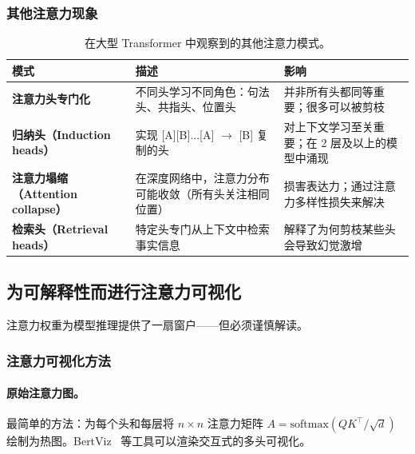 \subsubsection{其他注意力现象}
\label{other-attention-phenomena}

\begin{table}[ht!]
\centering\small
\caption{在大型 Transformer 中观察到的其他注意力模式。}
\noindent\begin{tabularx}{\linewidth}{@{}l Z{1.06} Z{0.94}@{}}
\toprule
\textbf{模式} & \textbf{描述} & \textbf{影响} \\
\midrule
\textbf{注意力头专门化} & 不同头学习不同角色：句法头、共指头、位置头~\cite{voita2019analyzing} & 并非所有头都同等重要；很多可以被剪枝 \\
\textbf{归纳头（Induction heads）} & 实现 [A][B]...[A] $\to$ [B] 复制的头~\cite{olsson2022context} & 对上下文学习至关重要；在 2 层及以上的模型中涌现 \\
\textbf{注意力塌缩（Attention collapse）} & 在深度网络中，注意力分布可能收敛（所有头关注相同位置） & 损害表达力；通过注意力多样性损失来解决 \\
\textbf{检索头（Retrieval heads）} & 特定头专门从上下文中检索事实信息~\cite{wu2024retrieval} & 解释了为何剪枝某些头会导致幻觉激增 \\
\bottomrule
\end{tabularx}
\end{table}

\subsection{为可解释性而进行注意力可视化}
\label{visualizing-attention-for-explainability}

注意力权重为模型推理提供了一扇窗户——但必须谨慎解读。

\subsubsection{注意力可视化方法}
\label{attention-visualization-methods}

\paragraph{原始注意力图。}
\label{raw-attention-maps.}

最简单的方法：为每个头和每层将 $n \times n$ 注意力矩阵 $A = \text{softmax}(QK^\top/\sqrt{d})$ 绘制为热图。BertViz~\cite{vig2019bertviz} 等工具可以渲染交互式的多头可视化。

